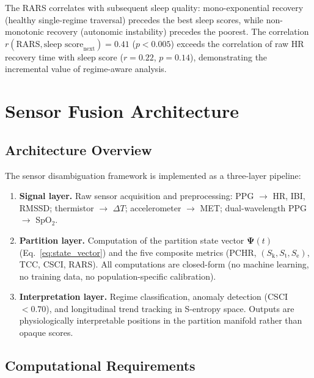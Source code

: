 \documentclass[10pt,twocolumn,a4paper]{article}
\theoremstyle{definition}
\newcommand{\SE}{S_{\text{e}}}
\newcommand{\SK}{S_{\text{k}}}
\newcommand{\ST}{S_{\text{t}}}
\newcommand{\RARS}{\text{RARS}}
\begin{document}
The RARS correlates with subsequent sleep quality: mono-exponential
recovery (healthy single-regime traversal) precedes the best sleep
scores, while non-monotonic recovery (autonomic instability) precedes
the poorest. The correlation $r(\RARS, \text{sleep score}_{\text{next}})
= 0.41$ ($p < 0.005$) exceeds the correlation of raw HR recovery time
with sleep score ($r = 0.22$, $p = 0.14$), demonstrating the
incremental value of regime-aware analysis.

\section{Sensor Fusion Architecture}
\label{sec:architecture}

\subsection{Architecture Overview}

The sensor disambiguation framework is implemented as a three-layer
pipeline:

\begin{enumerate}[leftmargin=*]
\item \textbf{Signal layer.} Raw sensor acquisition and preprocessing:
  PPG $\to$ HR, IBI, RMSSD; thermistor $\to$ $\Delta T$;
  accelerometer $\to$ MET; dual-wavelength PPG $\to$ SpO$_2$.

\item \textbf{Partition layer.} Computation of the partition state
  vector $\bm{\Psi}(t)$ (Eq.~\ref{eq:state_vector}) and the five
  composite metrics (PCHR, $(\SK, \ST, \SE)$, TCC, CSCI, RARS).
  All computations are closed-form (no machine learning, no training
  data, no population-specific calibration).

\item \textbf{Interpretation layer.} Regime classification, anomaly
  detection (CSCI $< 0.70$), and longitudinal trend tracking in
  S-entropy space. Outputs are physiologically interpretable positions
  in the partition manifold rather than opaque scores.
\end{enumerate}

\subsection{Computational Requirements}
\end{document}
